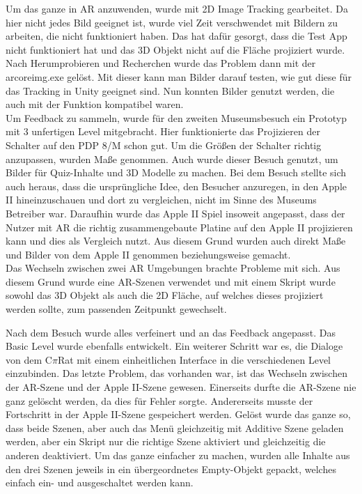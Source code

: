 Um das ganze in AR anzuwenden, wurde mit 2D Image Tracking gearbeitet. Da hier nicht jedes Bild geeignet ist, wurde viel Zeit verschwendet mit Bildern zu arbeiten, die nicht funktioniert haben. Das hat dafür gesorgt, dass die Test App nicht funktioniert hat und das 3D Objekt nicht auf die Fläche projiziert wurde. Nach Herumprobieren und Recherchen wurde das Problem dann mit der arcoreimg.exe gelöst. Mit dieser kann man Bilder darauf testen, wie gut diese für das Tracking in Unity geeignet sind. Nun konnten Bilder genutzt werden, die auch mit der Funktion kompatibel waren.\\ 

Um Feedback zu sammeln, wurde für den zweiten Museumsbesuch ein Prototyp mit 3 unfertigen Level mitgebracht. Hier funktionierte das Projizieren der Schalter auf den PDP 8/M schon gut. Um die Größen der Schalter richtig anzupassen, wurden Maße genommen. Auch wurde dieser Besuch genutzt, um Bilder für Quiz-Inhalte und 3D Modelle zu machen. Bei dem Besuch stellte sich auch heraus, dass die ursprüngliche Idee, den Besucher anzuregen, in den Apple II hineinzuschauen und dort zu vergleichen, nicht im Sinne des Museums Betreiber war. Daraufhin wurde das Apple II Spiel insoweit angepasst, dass der Nutzer mit AR die richtig zusammengebaute Platine auf den Apple II projizieren kann und dies als Vergleich nutzt. Aus diesem Grund wurden auch direkt Maße und Bilder von dem Apple II genommen beziehungsweise gemacht.\\

Das Wechseln zwischen zwei AR Umgebungen brachte Probleme mit sich. Aus diesem Grund wurde eine AR-Szenen verwendet und mit einem Skript wurde sowohl das 3D Objekt als auch die 2D Fläche, auf welches dieses projiziert werden sollte, zum passenden Zeitpunkt gewechselt.\\
\newline

Nach dem Besuch wurde alles verfeinert und an das Feedback angepasst. Das Basic Level wurde ebenfalls entwickelt. Ein weiterer Schritt war es, die Dialoge von dem C$\pi$Rat mit einem einheitlichen Interface in die verschiedenen Level einzubinden. Das letzte Problem, das vorhanden war, ist das Wechseln zwischen der AR-Szene und der Apple II-Szene gewesen. Einerseits durfte die AR-Szene nie ganz gelöscht werden, da dies für Fehler sorgte. Andererseits musste der Fortschritt in der Apple II-Szene gespeichert werden. Gelöst wurde das ganze so, dass beide Szenen, aber auch das Menü gleichzeitig mit Additive Szene geladen werden, aber ein Skript nur die richtige Szene aktiviert und gleichzeitig die anderen deaktiviert. Um das ganze einfacher zu machen, wurden alle Inhalte aus den drei Szenen jeweils in ein übergeordnetes Empty-Objekt gepackt, welches einfach ein- und ausgeschaltet werden kann. 

